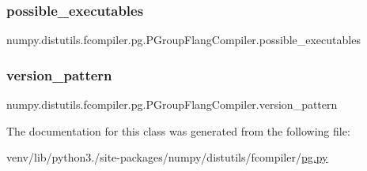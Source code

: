 \subsubsection{\texorpdfstring{possible\+\_\+executables}{possible\_executables}}
{\footnotesize\ttfamily numpy.\+distutils.\+fcompiler.\+pg.\+P\+Group\+Flang\+Compiler.\+possible\+\_\+executables\hspace{0.3cm}{\ttfamily [static]}}

\mbox{\label{classnumpy_1_1distutils_1_1fcompiler_1_1pg_1_1PGroupFlangCompiler_ad904bc947a2ccf9c1211e88cb8e44477}} 
\subsubsection{\texorpdfstring{version\+\_\+pattern}{version\_pattern}}
{\footnotesize\ttfamily numpy.\+distutils.\+fcompiler.\+pg.\+P\+Group\+Flang\+Compiler.\+version\+\_\+pattern\hspace{0.3cm}{\ttfamily [static]}}



The documentation for this class was generated from the following file\+:\begin{DoxyCompactItemize}
\item 
venv/lib/python3./site-\/packages/numpy/distutils/fcompiler/\hyperlink{pg_8py}{pg.\+py}\end{DoxyCompactItemize}
